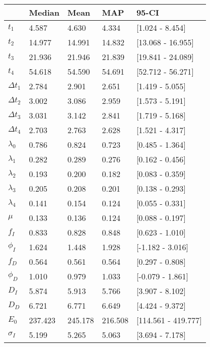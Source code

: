 \begin{tabular}{lllll}
\toprule
{} &   Median &     Mean &      MAP &                95-CI \\
\midrule
$t_1$        &    4.587 &    4.630 &    4.334 &      [1.024 - 8.454] \\
$t_2$        &   14.977 &   14.991 &   14.832 &    [13.068 - 16.955] \\
$t_3$        &   21.936 &   21.946 &   21.839 &    [19.841 - 24.089] \\
$t_4$        &   54.618 &   54.590 &   54.691 &    [52.712 - 56.271] \\
$\Delta t_1$ &    2.784 &    2.901 &    2.651 &      [1.419 - 5.055] \\
$\Delta t_2$ &    3.002 &    3.086 &    2.959 &      [1.573 - 5.191] \\
$\Delta t_3$ &    3.031 &    3.142 &    2.841 &      [1.719 - 5.168] \\
$\Delta t_4$ &    2.703 &    2.763 &    2.628 &      [1.521 - 4.317] \\
$\lambda_0$  &    0.786 &    0.824 &    0.723 &      [0.485 - 1.364] \\
$\lambda_1$  &    0.282 &    0.289 &    0.276 &      [0.162 - 0.456] \\
$\lambda_2$  &    0.193 &    0.200 &    0.182 &      [0.083 - 0.359] \\
$\lambda_3$  &    0.205 &    0.208 &    0.201 &      [0.138 - 0.293] \\
$\lambda_4$  &    0.141 &    0.154 &    0.124 &      [0.055 - 0.331] \\
$\mu$        &    0.133 &    0.136 &    0.124 &      [0.088 - 0.197] \\
$f_I$        &    0.833 &    0.828 &    0.848 &      [0.623 - 1.010] \\
$\phi_I$     &    1.624 &    1.448 &    1.928 &     [-1.182 - 3.016] \\
$f_D$        &    0.564 &    0.561 &    0.564 &      [0.297 - 0.808] \\
$\phi_D$     &    1.010 &    0.979 &    1.033 &     [-0.079 - 1.861] \\
$D_I$        &    5.874 &    5.913 &    5.766 &      [3.907 - 8.102] \\
$D_D$        &    6.721 &    6.771 &    6.649 &      [4.424 - 9.372] \\
$E_0$        &  237.423 &  245.178 &  216.508 &  [114.561 - 419.777] \\
$\sigma_I$   &    5.199 &    5.265 &    5.063 &      [3.694 - 7.178] \\

\end{tabular}
